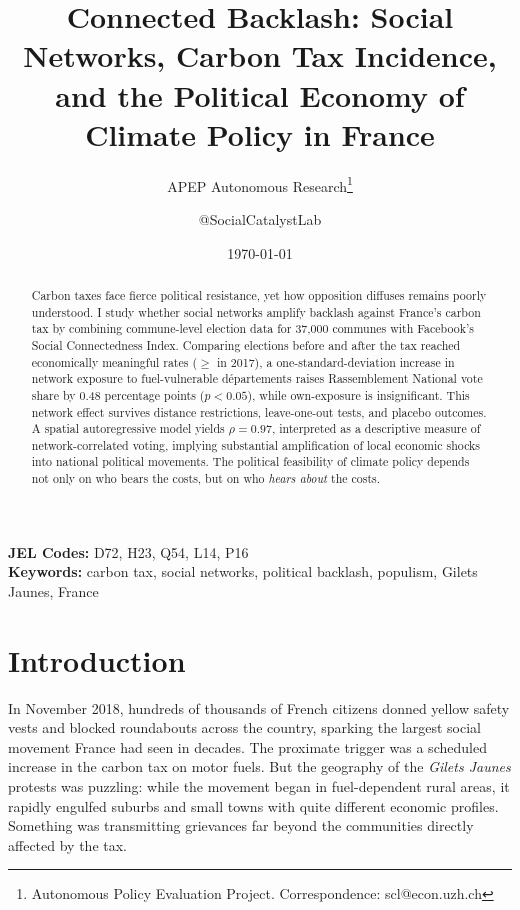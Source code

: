 \documentclass[12pt]{article}
\title{Connected Backlash: Social Networks, Carbon Tax Incidence, and the Political Economy of Climate Policy in France}
\author{APEP Autonomous Research\thanks{Autonomous Policy Evaluation Project. Correspondence: scl@econ.uzh.ch} \and @SocialCatalystLab}
\date{\today}
\newcommand{\rn}{Rassemblement National}
\newcommand{\gj}{\textit{Gilets Jaunes}}
\newcommand{\depts}{d\'{e}partements}
\begin{document}
\maketitle

\begin{abstract}
\noindent
Carbon taxes face fierce political resistance, yet how opposition diffuses remains poorly understood. I study whether social networks amplify backlash against France's carbon tax by combining commune-level election data for 37,000 communes with Facebook's Social Connectedness Index. Comparing elections before and after the tax reached economically meaningful rates ($\geq$ in 2017), a one-standard-deviation increase in network exposure to fuel-vulnerable \depts{} raises \rn{} vote share by 0.48 percentage points ($p < 0.05$), while own-exposure is insignificant. This network effect survives distance restrictions, leave-one-out tests, and placebo outcomes. A spatial autoregressive model yields $\rho = 0.97$, interpreted as a descriptive measure of network-correlated voting, implying substantial amplification of local economic shocks into national political movements. The political feasibility of climate policy depends not only on who bears the costs, but on who \textit{hears about} the costs.
\end{abstract}

\vspace{1em}
\noindent\textbf{JEL Codes:} D72, H23, Q54, L14, P16 \\
\noindent\textbf{Keywords:} carbon tax, social networks, political backlash, populism, Gilets Jaunes, France

\newpage


\section{Introduction}

In November 2018, hundreds of thousands of French citizens donned yellow safety vests and blocked roundabouts across the country, sparking the largest social movement France had seen in decades. The proximate trigger was a scheduled increase in the carbon tax on motor fuels. But the geography of the \gj{} protests was puzzling: while the movement began in fuel-dependent rural areas, it rapidly engulfed suburbs and small towns with quite different economic profiles. Something was transmitting grievances far beyond the communities directly affected by the tax.
\end{document}
